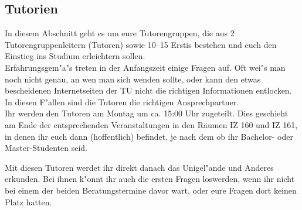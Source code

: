 \subsection{Tutorien}
%
%


In diesem Abschnitt geht es um eure Tutorengruppen, die aus 2 Tutorengruppenleitern (Tutoren) sowie 10--15 Erstis bestehen und euch den Einstieg ins Studium erleichtern sollen.\\
Erfahrungsgem"a"s treten in der Anfangszeit einige Fragen auf. Oft wei"s man noch nicht genau, an wen man sich wenden sollte, oder kann den etwas bescheidenen Internetseiten der TU nicht die richtigen Informationen entlocken. In diesen F"allen sind die Tutoren die richtigen Ansprechpartner.\\

Ihr werden den Tutoren am Montag um ca. 15:00 Uhr zugeteilt. Dies geschieht am Ende der entsprechenden Veranstaltungen in den Räumen IZ 160 und IZ 161, in denen ihr euch dann (hoffentlich) befindet, je nach dem ob ihr Bachelor- oder Master-Studenten seid.


Mit diesen Tutoren werdet ihr direkt danach das Unigel"ande und Anderes erkunden.
Bei ihnen k"onnt ihr auch die ersten Fragen loswerden, wenn 
ihr nicht bei einem der beiden Beratungstermine davor wart, oder eure Fragen dort keinen Platz hatten.


